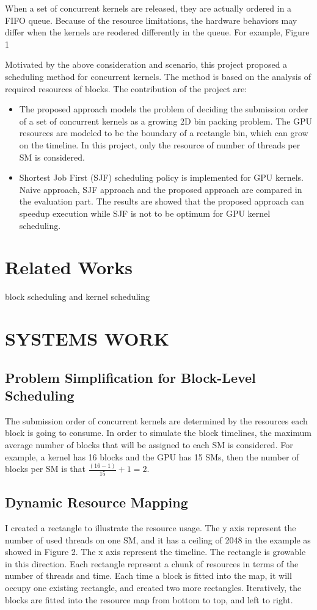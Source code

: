 \documentclass[12pt,journal,compsoc]{IEEEtran}
\begin{document}
When a set of concurrent kernels are released, they are actually ordered in a FIFO queue. Because of the resource limitations, the hardware behaviors may differ when the kernels are reodered differently in the queue. For example, Figure 1 

Motivated by the above consideration and scenario, this project proposed a scheduling method for concurrent kernels. The method is based on the analysis of required resources of blocks. 
The contribution of the project are:
\begin{itemize}
   \item The proposed approach models the problem of deciding the submission order of a set of concurrent kernels as a growing 2D bin packing problem. The GPU resources are modeled to be the boundary of a rectangle bin, which can grow on the timeline. In this project, only the resource of number of threads per SM is considered.
   \item Shortest Job First (SJF) scheduling policy is implemented for GPU kernels. Naive approach, SJF approach and the proposed approach are compared in the evaluation part. The results are showed that the proposed approach can speedup execution while SJF is not to be optimum for GPU kernel scheduling.
\end{itemize}


\section{Related Works}
block scheduling and kernel scheduling

\section{SYSTEMS WORK}

\subsection{Problem Simplification for Block-Level Scheduling}
The submission order of concurrent kernels are determined by the resources each block is going to consume. In order to simulate the block timelines, the maximum average number of blocks that will be assigned to each SM is considered. For example, a kernel has 16 blocks and the GPU has 15 SMs, then the number of blocks per SM is that $\frac{(16-1)}{15} + 1 = 2$.
\subsection{Dynamic Resource Mapping}
I created a rectangle to illustrate the resource usage. The y axis represent the number of used threads on one SM, and it has a ceiling of 2048 in the example as showed in Figure 2. The x axis represent the timeline. The rectangle is growable in this direction.  Each rectangle represent a chunk of resources in terms of the number of threads and time. Each time a block is fitted into the map, it will occupy one existing rectangle, and created two more rectangles. Iteratively, the blocks are fitted into the resource map from bottom to top, and left to right.
\end{document}
